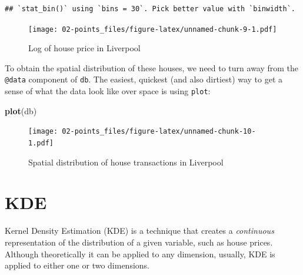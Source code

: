 \documentclass[]{book}
\newenvironment{Shaded}{\begin{snugshade}}{\end{snugshade}}
\newcommand{\CommentTok}[1]{\textcolor[rgb]{0.56,0.35,0.01}{\textit{#1}}}
\newcommand{\DataTypeTok}[1]{\textcolor[rgb]{0.13,0.29,0.53}{#1}}
\newcommand{\KeywordTok}[1]{\textcolor[rgb]{0.13,0.29,0.53}{\textbf{#1}}}
\newcommand{\NormalTok}[1]{#1}
\newcommand{\OperatorTok}[1]{\textcolor[rgb]{0.81,0.36,0.00}{\textbf{#1}}}
\newcommand{\StringTok}[1]{\textcolor[rgb]{0.31,0.60,0.02}{#1}}
\begin{document}
\begin{Shaded}
\end{Shaded}

\begin{verbatim}
## `stat_bin()` using `bins = 30`. Pick better value with `binwidth`.
\end{verbatim}

\begin{figure}
\centering
\texttt{[image: 02-points\_files/figure-latex/unnamed-chunk-9-1.pdf]}
\caption{\label{fig:unnamed-chunk-9}Log of house price in Liverpool}
\end{figure}

To obtain the spatial distribution of these houses, we need to turn away from the \texttt{@data} component of \texttt{db}. The easiest, quickest (and also dirtiest) way to get a sense of what the data look like over space is using \texttt{plot}:

\begin{Shaded}
\begin{Highlighting}[]
\KeywordTok{plot}\NormalTok{(db)}
\end{Highlighting}
\end{Shaded}

\begin{figure}
\centering
\texttt{[image: 02-points\_files/figure-latex/unnamed-chunk-10-1.pdf]}
\caption{\label{fig:unnamed-chunk-10}Spatial distribution of house transactions in Liverpool}
\end{figure}

\hypertarget{kde}{%
\section{KDE}\label{kde}}

Kernel Density Estimation (KDE) is a technique that creates a \emph{continuous} representation of the distribution of a given variable, such as house prices. Although theoretically it can be applied to any dimension, usually, KDE is applied to either one or two dimensions.
\end{document}
